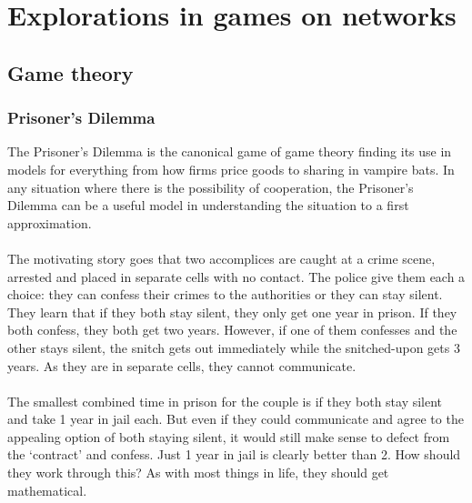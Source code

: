 \chapter{Explorations in games on networks}\label{ch:games-on-networks}
\section{Game theory}
\subsection{Prisoner's Dilemma}\label{subs:prisoners-dilemma}
The Prisoner's Dilemma is the canonical game of game theory finding its use in models for everything from how firms price goods\cite{p-d-goods} to sharing in vampire bats\cite{p-d-nature}. In any situation where there is the possibility of cooperation, the Prisoner's Dilemma can be a useful model in understanding the situation to a first approximation.\\
\\
The motivating story goes that two accomplices are caught at a crime scene, arrested and placed in separate cells with no contact. The police give them each a choice: they can confess their crimes to the authorities or they can stay silent. They learn that if they both stay silent, they only get one year in prison. If they both confess, they both get two years. However, if one of them confesses and the other stays silent, the snitch gets out immediately while the snitched-upon gets 3 years. As they are in separate cells, they cannot communicate.\\
\\
The smallest combined time in prison for the couple is if they both stay silent and take 1 year in jail each. But even if they could communicate and agree to the appealing option of both staying silent, it would still make sense to defect from the `contract' and confess. Just 1 year in jail is clearly better than 2. How should they work through this? As with most things in life, they should get mathematical.
